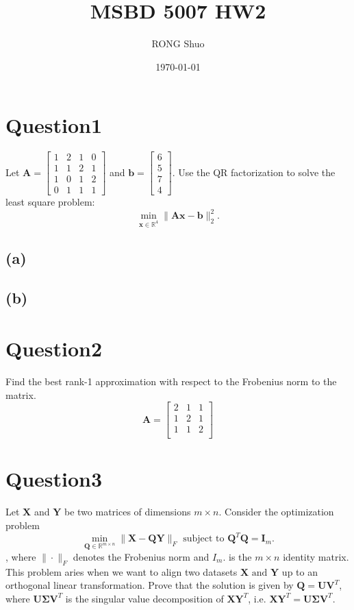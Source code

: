 \documentclass{article}
\title{MSBD 5007 HW2}
\author{RONG Shuo}
\date{\today}
\newcommand{\R}{\mathbb{R}}
\begin{document}
\maketitle

\section*{Question1}
Let \(\bm{A} = \begin{bmatrix}
    1 & 2 & 1 & 0 \\ 
    1 & 1 & 2 & 1 \\ 
    1 & 0 & 1 & 2 \\ 
    0 & 1 & 1 & 1  
\end{bmatrix}\) and \(\bm{b} = \begin{bmatrix}
    6 \\
    5 \\
    7 \\
    4 
\end{bmatrix}\). Use the QR factorization to solve the least square problem:
\[
    \min_{\bm{x} \in \R^4} \|\bm{Ax} - \bm{b}\|_2^2.
\]

\subsection*{(a)}

\subsection*{(b)}

\section*{Question2}
Find the best rank-1 approximation with respect to the Frobenius norm to the matrix.
\[\bm{A} = \begin{bmatrix}
   2 & 1 & 1 \\ 
   1 & 2 & 1 \\ 
   1 & 1 & 2 \\ 
\end{bmatrix}\]
\section*{Question3}
Let \(\bm{X}\) and \(\bm{Y}\) be two matrices of dimensions \(m \times n\). Consider the optimization problem
\[
    \min_{\bm{Q}\in\R^{m\times n}} \|\bm{X} - \bm{QY}\|_F \text{ subject to } \bm{Q}^T\bm{Q} = \bm{I}_m.
\],
where \(\|\cdot\|_F\) denotes the Frobenius norm and \(I_m\). is the \(m \times n\) identity matrix. This problem aries when we want to align two datasets \(\bm{X} \text{ and }\bm{Y}\) up to an orthogonal linear transformation. Prove that the solution is given by \(\bm{Q} = \bm{U}\bm{V}^T\), where \(\bm{U}\bm{\Sigma}\bm{V}^T\) is the singular value decomposition of \(\bm{XY}^T\), i.e. \(\bm{X}\bm{Y}^T = \bm{U}\bm{\Sigma}\bm{V}^T\).
\end{document}
